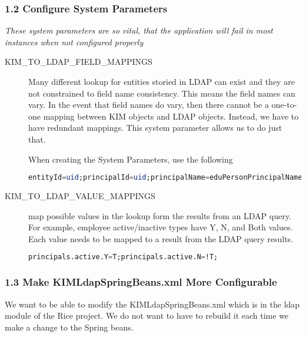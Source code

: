 \subsubsection*{1.2 Configure System Parameters}
\emph{These system parameters are so vital, that the application will fail
in most instances when not configured properly}
\begin{description}
\item [KIM\_TO\_LDAP\_FIELD\_MAPPINGS] Many different lookup for
  entities storied in LDAP can exist and they are not constrained to
  field name consistency. This means the field names can vary. In the
  event that field names do vary, then there cannot be a one-to-one
  mapping between KIM objects and LDAP objects. Instead, we have to
  have redundant mappings. This system parameter allows us to do just
  that.

When creating the System Parameters, use the following 

\begin{lstlisting}[language=sql,basicstyle=\scriptsize,backgroundcolor=\color{ubergray},caption={trnapp-config.xml},frame=single,breaklines=true]
entityId=uid;principalId=uid;principalName=eduPersonPrincipalName;givenName=sn;principals.principalName=eduPersonPrincipalName;persons.principalName=eduPersonPrincipalName;principals.principalId=uid;principals.active=employeeStatus;lastName=sn;firstName=givenName;employmentInformation.employeeStatus=employeeStatus;employmentInformation.employeeId=emplId,facultyId;names.lastName=sn;names.firstName=givenName;employmentInformation.employeeStatusCode=employeeStatus;
\end{lstlisting}

\item [KIM\_TO\_LDAP\_VALUE\_MAPPINGS] map possible values in the
  lookup form the results from an LDAP query. For example, employee
  active/inactive types have Y, N, and Both values. Each value needs
  to be mapped to a result from the LDAP query results.

\begin{lstlisting}[language=sql,basicstyle=\scriptsize,backgroundcolor=\color{ubergray},caption={trnapp-config.xml},frame=single,breaklines=true]
principals.active.Y=T;principals.active.N=!T;
\end{lstlisting}

\end{description}

\subsubsection*{1.3 Make KIMLdapSpringBeans.xml More Configurable}
We want to be able to modify the KIMLdapSpringBeans.xml which is in
the ldap module of the Rice project. We do not want to have to rebuild
it each time we make a change to the Spring beans.

